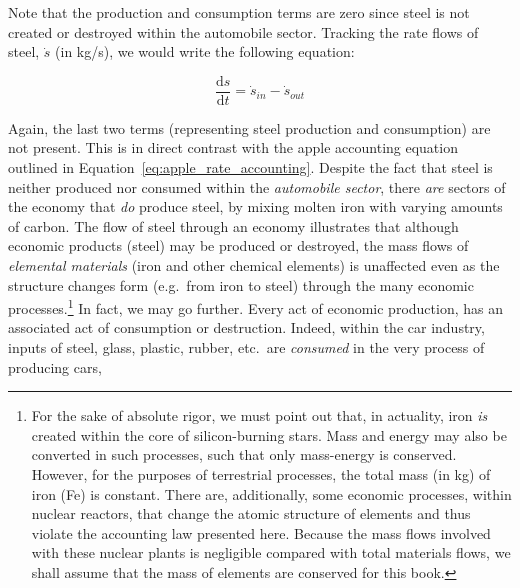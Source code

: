 Note that the production and consumption terms are zero
since steel is not created or destroyed within the automobile
sector. Tracking the rate flows of steel, 
$\dot{s}$ (in kg/s),
we would write the following equation:

\begin{equation}
	\frac{\mathrm{d}s}{\mathrm{d}t}
	= \dot{s}_{in}
	- \dot{s}_{out}
\end{equation}

Again, the last two terms 
(representing steel production and consumption) 
are not present. 
This is in direct contrast with the apple 
accounting equation outlined in Equation~\ref{eq:apple_rate_accounting}. 
Despite the fact that steel is neither produced nor consumed 
within the \emph{automobile sector}, 
there \emph{are} sectors of the economy 
that \emph{do} produce steel,
by mixing molten iron with varying amounts of carbon. 
The flow of steel through an economy illustrates that 
although economic products (steel) 
may be produced or destroyed, 
the mass flows of \emph{elemental materials} 
(iron and other chemical elements)
is unaffected even as the structure changes form (e.g.\ from iron to steel) 
through the many economic processes.\footnote{For the sake of
absolute rigor, we must point out that, in actuality, iron \emph{is} created within
the core of silicon-burning stars. 
Mass and energy may also be converted in such processes, 
such that only mass-energy is conserved. 
However, for the purposes of terrestrial
processes, the total mass (in kg) of iron (Fe) is constant. 
There are, additionally, some economic
processes, within nuclear reactors, that change the atomic structure of elements
and thus violate the accounting law presented here. 
Because the mass flows involved
with these nuclear plants is negligible compared with total materials flows, we
shall assume that the mass of elements are conserved for this book.}
In fact, we may go further.
Every act of economic production,
has an associated act of consumption or destruction.
Indeed, within the car industry, inputs of steel, glass, plastic, rubber, etc.\ 
are \emph{consumed} in the very process of producing cars, 
